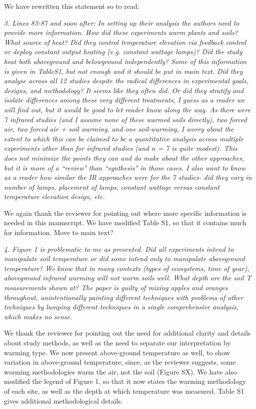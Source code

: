 \documentclass[11pt,a4paper]{letter}
\begin{document}
\begin{letter}{}
We have rewritten this statement so to read:


\emph{3. Lines 83-87 and soon after: In setting up their analysis the authors need to provide more information. How did these experiments warm plants and soils? What source of heat? Did they control temperature elevation via feedback control or deploy constant output heating (e.g. constant wattage lamps)? Did the study heat both aboveground and belowground independently? Some of this information is given in TableS1, but not enough and it should be put in main text. Did they analyse across all 12 studies despite the radical differences in experimental goals, designs, and methodology? It seems like they often did. Or did they stratify and isolate differences among these very different treatments, I guess as a reader we will find out, but it would be good to let reader know along the way. As there were 7 infrared studies (and I assume none of these warmed soils directly), two forced air, two forced air + soil warming, and one soil-warming, I worry about the extent to which this can be claimed to be a quantitative analysis across multiple experiments other than for infrared
studies (and n = 7 is quite modest). This does not minimize the points they can and do make about the other approaches, but it is more of a ``review" than ``synthesis" in those cases. I also want to know as a reader how similar the IR approaches were for the 7 studies- did they vary in number of lamps, placement of lamps, constant wattage versus constant temperature elevation design, etc.}
\par We again thank the reviewer for pointing out where more specific information is needed in this manuscript. We have modified Table S1, so that it contains much for information. Move to main text?

\par \emph{4. Figure 1 is problematic to me as presented. Did all experiments intend to manipulate soil temperature or did some intend only to manipulate aboveground temperature? We know that in many contexts (types of ecosystems, time of year), aboveground infrared warming will not warm soils well. What depth are the soil T measurements shown at? The paper is guilty of mixing apples and oranges throughout, unintentionally painting different techniques with problems of other techniques by lumping different techniques in a single comprehensive analysis, which makes no sense.}
\par We thank the reviewer for pointing out the need for additional clarity and details about study methods, as well as the need to separate our interpretation by warming type. We now present above-ground temperature as well, to show variation in above-ground temperature, since, as the reviewer suggests, some warming methodologies warm the air, not the soil (Figure SX). We have also modified the legend of Figure 1, so that it now  states the warming methodology of each site, as well as the depth at which temperature was measured. Table S1 gives additional methodological details.



\end{letter}
\end{document}
